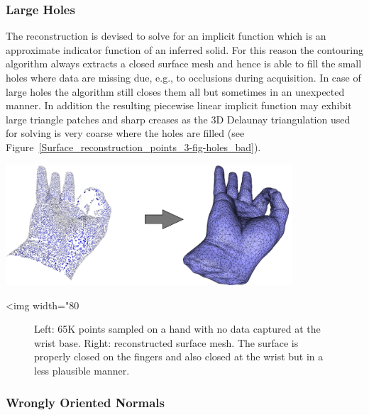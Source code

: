 \subsubsection{Large Holes}

The reconstruction is devised to solve for an implicit function which is an approximate indicator function of an inferred solid. For this reason the contouring algorithm always extracts a closed surface mesh and hence is able to fill the small holes where data are missing due, e.g., to occlusions during acquisition. In case of large holes the algorithm still closes them all but sometimes in an unexpected manner. In addition the resulting piecewise linear implicit function may exhibit large triangle patches and sharp creases as the 3D Delaunay triangulation used for solving is very coarse where the holes are filled (see Figure~\ref{Surface_reconstruction_points_3-fig-holes_bad}). 

\begin{center}
    \label{Surface_reconstruction_points_3-fig-holes_bad}
    \begin{ccTexOnly}
\includegraphics[width=0.8\textwidth]{Surface_reconstruction_points_3/holes_bad} 
    \end{ccTexOnly}
    \begin{ccHtmlOnly}
        <img width="80%
    \end{ccHtmlOnly}
    \begin{figure}[h]
        \caption{Left: 65K points sampled on a hand with no data
                 captured at the wrist base.
                 Right: reconstructed surface mesh. The surface is
                 properly closed on the fingers and also closed 
                 at the wrist but in a less plausible manner.}
    \end{figure}
\end{center}


\subsubsection{Wrongly Oriented Normals}

